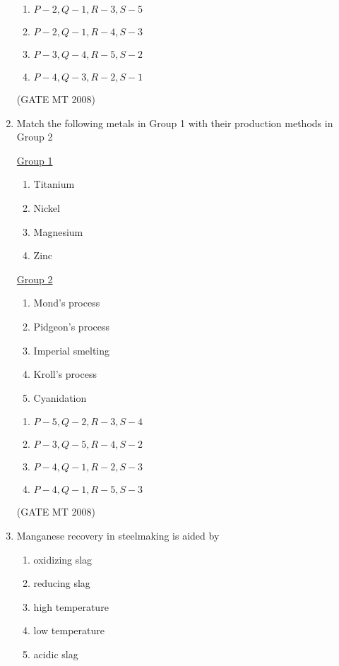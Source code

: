 \documentclass[11pt, letterpaper]{article}
\theoremstyle{remark}
\begin{document}
\begin{enumerate}
\begin{multicols}{2}
\begin{enumerate}
\item $P-2, Q-1, R-3, S-5$
\item $P-2, Q-1, R-4, S-3$
\item $P-3, Q-4, R-5, S-2$
\item $P-4, Q-3, R-2, S-1$
\end{enumerate}
\end{multicols}

\hfill(GATE MT 2008)

\item Match the following metals in Group 1 with their production methods in Group 2
\begin{multicols}{2}
\underline{Group 1}
\begin{enumerate}[label=(\Alph*), start=16]
\item Titanium
\item Nickel
\item Magnesium
\item Zinc
\end{enumerate}

\underline{Group 2}
\begin{enumerate}[label=(\arabic*), start=1]
\item Mond's process
\item Pidgeon's process
\item Imperial smelting
\item Kroll's process
\item Cyanidation
\end{enumerate}
\end{multicols}

\begin{multicols}{2}
\begin{enumerate}
\item $P-5, Q-2, R-3, S-4$
\item $P-3, Q-5, R-4, S-2$
\item $P-4, Q-1, R-2, S-3$
\item $P-4, Q-1, R-5, S-3$
\end{enumerate}
\end{multicols}

\hfill(GATE MT 2008)

\item Manganese recovery in steelmaking is aided by
\begin{enumerate}[label=(\MakeUppercase{\alph*}), start=16]
\item oxidizing slag
\item reducing slag
\item high temperature
\item low temperature
\item acidic slag 
\end{enumerate}


\end{enumerate}
\end{document}
